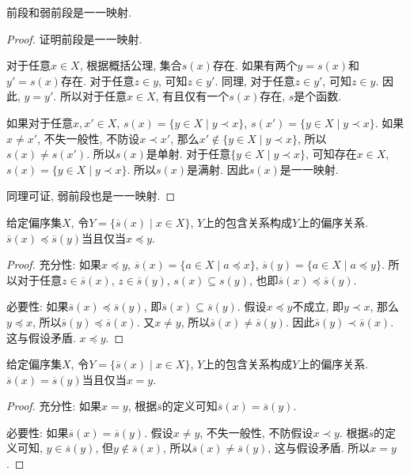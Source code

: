 \begin{proposition}
	前段和弱前段是一一映射.
\end{proposition}

\begin{proof}
	证明前段是一一映射.
	
	对于任意$x\in X$, 根据概括公理, 集合$s(x)$存在. 如果有两个$y=s(x)$和$y'=s(x)$存在. 对于任意$z\in y$, 可知$z\in y'$. 同理, 对于任意$z\in y'$, 可知$z\in y$. 因此, $y=y'$. 所以对于任意$x\in X$, 有且仅有一个$s(x)$存在, $s$是个函数.
	
	如果对于任意$x,x'\in X$, $s(x)=\{y\in X\mid y\prec x\}$, $s(x')=\{y\in X\mid y\prec x\}$. 如果$x\neq x'$, 不失一般性, 不防设$x\prec x'$, 那么$x'\notin \{y\in X\mid y\prec x\}$, 所以$s(x)\neq s(x')$. 所以$s(x)$是单射. 对于任意$\{y\in X\mid y\prec x\}$, 可知存在$x\in X$, $s(x)=\{y\in X\mid y\prec x\}$. 所以$s(x)$是满射. 因此$s(x)$是一一映射.
	
	同理可证, 弱前段也是一一映射.
\end{proof}

\begin{proposition}
	给定偏序集$X$, 令$Y=\{\overline s(x)\mid x\in X\}$, $Y$上的包含关系构成$Y$上的偏序关系.
	$\overline s(x)\preccurlyeq \overline s(y)$当且仅当$x\preccurlyeq y$.
\end{proposition}

\begin{proof}
	充分性: 如果$x\preccurlyeq y$, $\overline s(x)=\{a\in X\mid a\preccurlyeq x\}$, $\overline s(y)=\{a\in X\mid a\preccurlyeq y\}$. 所以对于任意$z\in \overline s(x)$, $z\in \overline s(y)$, $s(x)\subseteq s(y)$, 也即$\overline s(x)\preccurlyeq \overline s(y)$.
	
	必要性: 如果$\overline s(x)\preccurlyeq \overline s(y)$, 即$\overline s(x)\subseteq \overline s(y)$. 假设$x\preccurlyeq y$不成立, 即$y\prec x$, 那么$y\preccurlyeq x$, 所以$\overline s(y)\preccurlyeq \overline s(x)$. 又$x\neq y$, 所以$\overline s(x)\neq \overline s(y)$. 因此$\overline s(y)\prec \overline s(x)$. 这与假设矛盾. $x\preccurlyeq y$.
\end{proof}

\begin{proposition}
	给定偏序集$X$, 令$Y=\{\overline s(x)\mid x\in X\}$, $Y$上的包含关系构成$Y$上的偏序关系.
	$\overline s(x)=\overline s(y)$当且仅当$x=y$.
\end{proposition}

\begin{proof}
	充分性: 如果$x=y$, 根据$\overline s$的定义可知$\overline s(x)=\overline s(y)$.
	
	必要性: 如果$\overline s(x)=\overline s(y)$. 假设$x\neq y$, 不失一般性, 不防假设$x\prec y$. 根据$\overline s$的定义可知, $y\in \overline s(y)$, 但$y\notin \overline s(x)$, 所以$\overline s(x)\neq \overline s(y)$, 这与假设矛盾. 所以$x=y$.
\end{proof}

